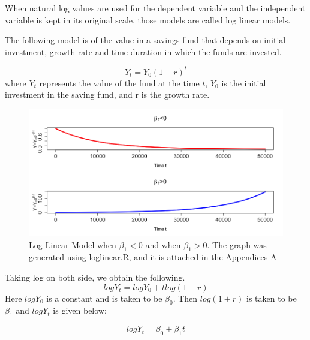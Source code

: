When natural log values are used for the dependent variable and the independent variable is kept in its original scale, those models are called log linear models. 

The following model is of the value in a savings fund that depends on initial investment, growth rate and time duration in which the funds are invested. 

\begin{equation}
Y_t = Y_0{(1+r)}^t
\end{equation}
where $Y_t$ represents the value of the fund at the time $t$, $Y_0$ is the initial investment in the saving fund, and r is the growth rate.

\begin{figure}[!ht]
\centering
\includegraphics[scale=.5]{Images/LogLinear}
\caption{Log Linear Model when $\beta_1 < 0$ and when $\beta_1 > 0$. The graph was generated using loglinear.R, and it is attached in the Appendices A}
\label{fig:LogLinear}
\end{figure}
Taking log on both side, we obtain the following. 
\begin{equation}
log Y_t = log Y_0 + t log (1+r)
\end{equation}
Here $log Y_0$ is a constant and is taken to be $\beta_0$. Then $log (1+r)$ is taken to be $\beta_1$ and $log Y_t$ is given below:

\begin{equation}
log Y_t = {\beta}_0 + {\beta}_1 t
\end{equation}

